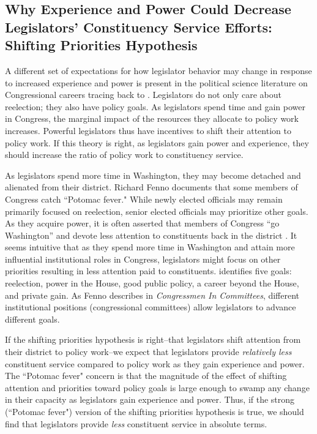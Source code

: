 \documentclass[12pt]{article}
\begin{document}
\subsection{Why Experience and Power Could Decrease Legislators' Constituency Service Efforts: Shifting Priorities Hypothesis}

A different set of expectations for how legislator behavior may change in response to increased experience and power is present in the political science literature on Congressional careers tracing back to \citet{Fenno1973}. Legislators do not only care about reelection; they also have policy goals. As legislators spend time and gain power in Congress, the marginal impact of the resources they allocate to policy work increases. Powerful legislators thus have incentives to shift their attention to policy work. If this theory is right, as legislators gain power and experience, they should increase the ratio of policy work to constituency service.

As legislators spend more time in Washington, they may become detached and alienated from their district. Richard Fenno documents that some members of Congress catch ``Potomac fever." While newly elected officials may remain primarily focused on reelection, senior elected officials may prioritize other goals. As they acquire power, it is often asserted that members of Congress ``go Washington'' and devote less attention to constituents back in the district \citep{Fenno1978}. It seems intuitive that as they spend more time in Washington and attain more influential institutional roles in Congress, legislators might focus on other priorities resulting in less attention paid to constituents.  \citet{Fenno1973} identifies five goals: reelection, power in the House, good public policy, a career beyond the House, and private gain. As Fenno describes in \textit{Congressmen In Committees}, different institutional positions (congressional committees) allow legislators to advance different goals. 

If the shifting priorities hypothesis is right--that legislators shift attention from their district to policy work--we expect that legislators provide \textit{relatively less} constituent service compared to policy work as they gain experience and power. The ``Potomac fever" concern is that the magnitude of the effect of shifting attention and priorities toward policy goals is large enough to swamp any change in their capacity as legislators gain experience and power. Thus, if the strong (``Potomac fever") version of the shifting priorities hypothesis is true, we should find that legislators provide \textit{less} constituent service in absolute terms. 
\end{document}
